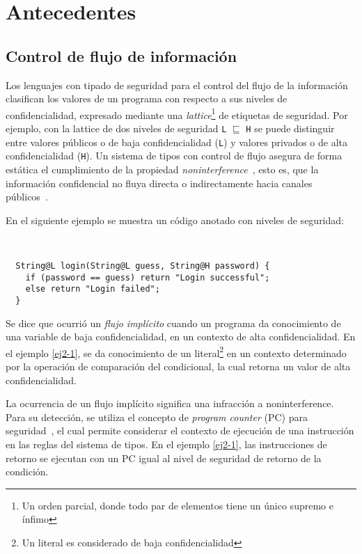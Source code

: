 \chapter{Antecedentes}

\section{Control de flujo de información}
Los lenguajes con tipado de seguridad para el control del flujo de la información clasifican los valores de un programa con respecto a sus niveles de confidencialidad, expresado mediante una \emph{lattice}\footnote{Un orden parcial, donde todo par de elementos tiene un único supremo e ínfimo} de etiquetas de seguridad. Por ejemplo, con la lattice de dos niveles de seguridad \texttt{L} $\sqsubseteq$ \texttt{H} se puede distinguir entre valores públicos o de baja confidencialidad (\texttt{L}) y valores privados o de alta confidencialidad (\texttt{H}). Un sistema de tipos con control de flujo asegura de forma estática el cumplimiento de la propiedad \emph{noninterference}~\cite{noninterference}, esto es, que la información confidencial no fluya directa o indirectamente hacia canales públicos~\cite{volpanoAl:S96}.

En el siguiente ejemplo se muestra un código anotado con niveles de seguridad:

\begin{ej} \ \\
  \normalfont
  \label{ej2-1}
\begin{lstlisting}
  String@L login(String@L guess, String@H password) {
    if (password == guess) return "Login successful";
    else return "Login failed";
  }
\end{lstlisting}
\end{ej}

Se dice que ocurrió un \emph{flujo implícito} cuando un programa da conocimiento de una variable de baja confidencialidad, en un contexto de alta confidencialidad. En el ejemplo \ref{ej2-1}, se da conocimiento de un literal\footnote{Un literal es considerado de baja confidencialidad} en un contexto determinado por la operación de comparación del condicional, la cual retorna un valor de alta confidencialidad.

La ocurrencia de un flujo implícito significa una infracción a noninterference. Para su detección, se utiliza el concepto de \textit{program counter} (PC) para seguridad~\cite{pc}, el cual permite considerar el contexto de ejecución de una instrucción en las reglas del sistema de tipos. En el ejemplo \ref{ej2-1}, las instrucciones de retorno se ejecutan con un PC igual al nivel de seguridad de retorno de la condición.

